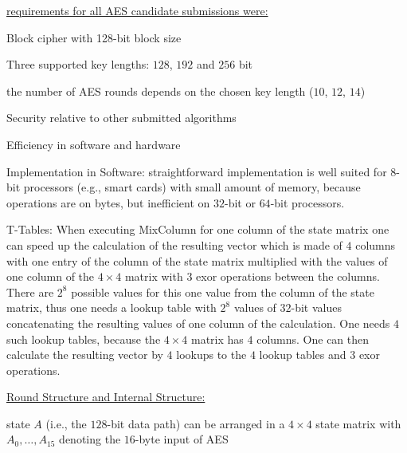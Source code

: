 \documentclass[landscape, a4paper]{article}
\begin{document}
\begin{minipage}[t]{0.198\pagewidth}
	\begin{betterlist}
		\item \underline{requirements for all AES candidate submissions were:}
		\begin{betterlist}
			\item Block cipher with 128-bit block size
			\item Three supported key lengths: $128$, $192$ and $256$ bit
			\begin{betterlist}
				\item the number of AES rounds depends on the chosen key length ($10$, $12$, $14$)
			\end{betterlist}
			\item Security relative to other submitted algorithms
			\item Efficiency in software and hardware
			\begin{betterlist}
				\item \alert{Implementation in Software:} straightforward implementation is well suited for $8$-bit processors (e.g., smart cards) with small amount of memory, because operations are on bytes, but inefficient on $32$-bit or $64$-bit processors.
				\item \alert{T-Tables:} When executing MixColumn for one column of the state matrix one can speed up the calculation of the resulting vector which is made of $4$ \alert{columns} with one entry of the column of the state matrix multiplied with the values of one column of the $4\times 4$ matrix with $3$ exor operations between the columns. There are $2^8$ possible values for this one value from the column of the state matrix, thus one needs a lookup table with $2^8$ values of $32$-bit values concatenating the resulting values of one column of the calculation. One needs $4$ such lookup tables, because the $4\times 4$ matrix has $4$ columns. One can then calculate the resulting vector by $4$ lookups to the $4$ lookup tables and $3$ exor operations.
			\end{betterlist}
		\end{betterlist}
		\item \underline{Round Structure and Internal Structure:}
		\begin{betterlist}
			\item state $A$ (i.e., the $128$-bit data path) can be arranged in a $4\times 4$ \alert{state matrix} with $A_0,\ldots, A_{15}$ denoting the $16$-byte input of AES

\end{betterlist}
\end{betterlist}
\end{minipage}
\end{document}
